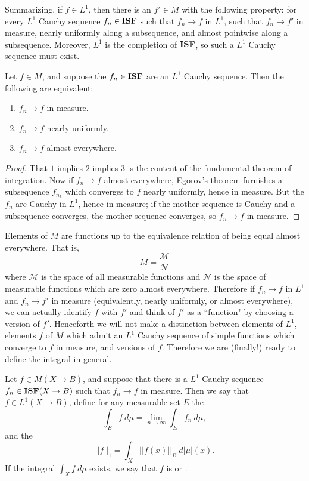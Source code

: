 \begin{subsec}
Summarizing, if $f \in L^1$, then there is an $f' \in M$ with the following property: for every $L^1$ Cauchy sequence $f_n \in \mathbf{ISF}$ such that $f_n \to f$ in $L^1$, such that $f_n \to f'$ in measure, nearly uniformly along a subsequence, and almost pointwise along a subsequence.
Moreover, $L^1$ is the completion of $\mathbf{ISF}$, so such a $L^1$ Cauchy sequence must exist.
\end{subsec}

\begin{corollary}
Let $f \in M$, and suppose the $f_n \in \mathbf{ISF}$ are an $L^1$ Cauchy sequence. Then the following are equivalent:
\begin{enumerate}
\item $f_n \to f$ in measure.
\item $f_n \to f$ nearly uniformly.
\item $f_n \to f$ almost everywhere.
\end{enumerate}
\end{corollary}
\begin{proof}
That $1$ implies $2$ implies $3$ is the content of the fundamental theorem of integration.
Now if $f_n \to f$ almost everywhere, Egorov's theorem furnishes a subsequence $f_{n_k}$ which converges to $f$ nearly uniformly, hence in measure.
But the $f_n$ are Cauchy in $L^1$, hence in measure; if the mother sequence is Cauchy and a subsequence converges, the mother sequence converges, so $f_n \to f$ in measure.
\end{proof}

\begin{subsec}
Elements of $M$ are functions up to the equivalence relation of being equal almost everywhere.
That is,
\[M = \frac{\mathcal M}{\mathcal N}\]
where $\mathcal M$ is the space of all measurable functions and $\mathcal N$ is the space of measurable functions which are zero almost everywhere.
Therefore if $f_n \to f$ in $L^1$ and $f_n \to f'$ in measure (equivalently, nearly uniformly, or almost everywhere), we can actually identify $f$ with $f'$ and think of $f'$ as a ``function" by choosing a version of $f'$.
Henceforth we will not make a distinction between elements of $L^1$, elements $f$ of $M$ which admit an $L^1$ Cauchy sequence of simple functions which converge to $f$ in measure, and versions of $f$.
Therefore we are (finally!) ready to define the integral in general.
\end{subsec}

\begin{definition}
Let $f \in M(X \to B)$, and suppose that there is a $L^1$ Cauchy sequence $f_n \in \mathbf{ISF}(X \to B)$ such that $f_n \to f$ in measure. Then we say that $f \in L^1(X \to B)$, define for any measurable set $E$ the 
\[\int_E f ~d\mu = \lim_{n \to \infty} \int_E f_n~d\mu,\]
and the 
\[||f||_1 = \int_X ||f(x)||_B ~d|\mu|(x).\]
If the integral $\int_X f~d\mu$ exists, we say that $f$ is  or .
\end{definition}

